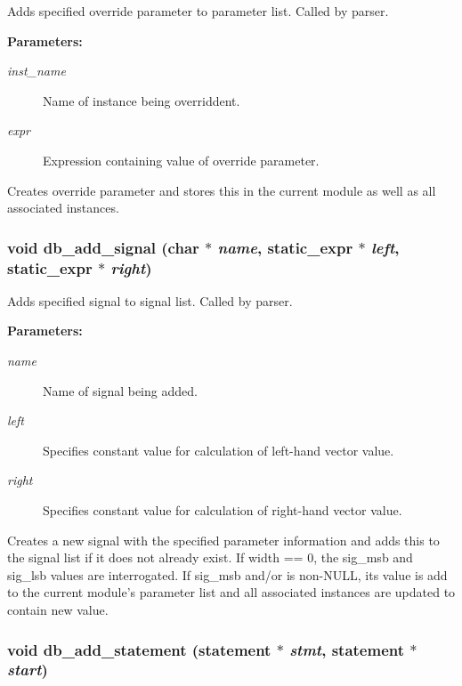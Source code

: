 Adds specified override parameter to parameter list. Called by parser.

\begin{Desc}
\item[{\bf Parameters: }]\par
\begin{description}
\item[
{\em inst\_\-name}]Name of instance being overriddent. \item[
{\em expr}]Expression containing value of override parameter.

\end{description}
\end{Desc}
Creates override parameter and stores this in the current module as well as all associated instances. 
\subsubsection{\setlength{\rightskip}{0pt plus 5cm}void db\_\-add\_\-signal (char $\ast$ {\em name}, {\bf static\_\-expr} $\ast$ {\em left}, {\bf static\_\-expr} $\ast$ {\em right})}\label{db_8h_a8}


Adds specified signal to signal list. Called by parser.

\begin{Desc}
\item[{\bf Parameters: }]\par
\begin{description}
\item[
{\em name}]Name of signal being added. \item[
{\em left}]Specifies constant value for calculation of left-hand vector value. \item[
{\em right}]Specifies constant value for calculation of right-hand vector value.

\end{description}
\end{Desc}
Creates a new signal with the specified parameter information and adds this to the signal list if it does not already exist. If width == 0, the sig\_\-msb and sig\_\-lsb values are interrogated. If sig\_\-msb and/or is non-NULL, its value is add to the current module's parameter list and all associated instances are updated to contain new value. 
\subsubsection{\setlength{\rightskip}{0pt plus 5cm}void db\_\-add\_\-statement ({\bf statement} $\ast$ {\em stmt}, {\bf statement} $\ast$ {\em start})}\label{db_8h_a14}


